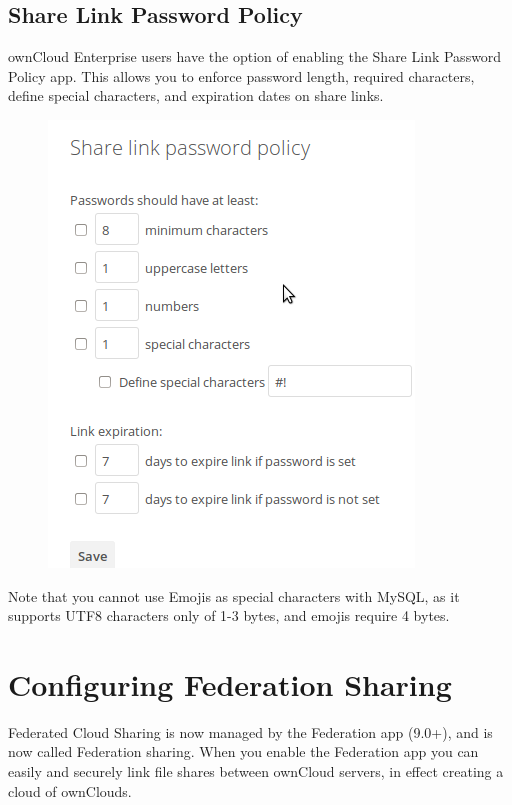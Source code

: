 \documentclass[letterpaper,10pt,english]{sphinxmanual}
\begin{document}
\subsection{Share Link Password Policy}
\label{configuration_files/file_sharing_configuration:share-link-password-policy}\label{configuration_files/file_sharing_configuration:password-policy-label}
ownCloud Enterprise users have the option of enabling the Share Link Password
Policy app. This allows you to enforce password length, required characters,
define special characters, and expiration dates on share links.
\begin{figure}[htbp]
\centering

\includegraphics{sharing-files-2.png}
\end{figure}

Note that you cannot use Emojis as special characters with MySQL, as it
supports UTF8 characters only of 1-3 bytes, and emojis require 4 bytes.


\section{Configuring Federation Sharing}
\label{configuration_files/federated_cloud_sharing_configuration:configuring-federation-sharing}\label{configuration_files/federated_cloud_sharing_configuration::doc}
Federated Cloud Sharing is now managed by the Federation app (9.0+), and is
now called Federation sharing. When you enable the Federation app you can
easily and securely link file shares between ownCloud servers, in effect
creating a cloud of ownClouds.
\end{document}
